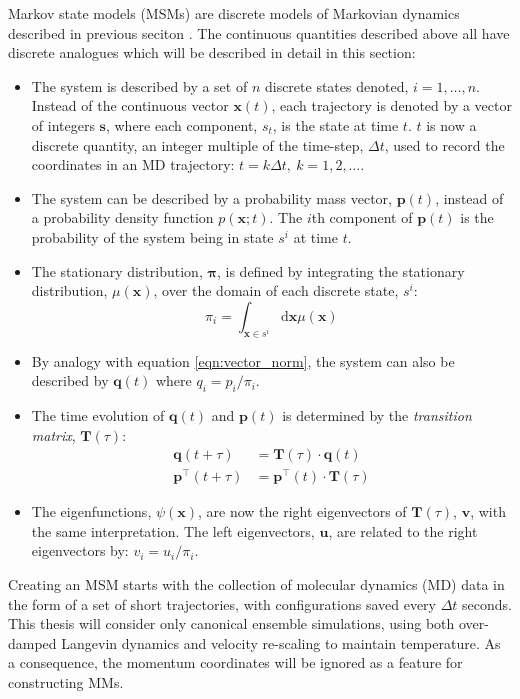 Markov state models (MSMs) are discrete models of Markovian dynamics described in previous seciton \cite{prinzMarkovModelsMolecular2011}. The continuous quantities described above all have discrete analogues which will be described in detail in this section:
\begin{itemize}
    \item The system is described by a set of $n$ discrete states denoted, $i=1, \ldots, n$. Instead of the continuous vector $\mathbf{x}(t)$, each trajectory is denoted by a vector of integers $\mathbf{s}$, where each component, $s_t$, is the state at time $t$. $t$ is now a discrete quantity, an integer multiple of the time-step, $\Delta t$, used to record the coordinates in an MD trajectory: $t=k\Delta t,\ k=1, 2, \ldots$. 
    \item The system can be described by a probability mass vector, $\mathbf{p}(t)$,  instead of a probability density function $p(\mathbf{x};t)$. The $i$th component of $\mathbf{p}(t)$ is the probability of the system being in  state $s^{i}$ at time $t$.
    \item The stationary distribution, $\bm{\pi}$, is defined by integrating the stationary distribution, $\mu(\mathbf{x})$, over the domain of each discrete state, $s^{i}$:
        \begin{equation*}
            \pi_{i}=\int_{\mathbf{x} \in s^{i}} \mathrm{d}\mathbf{x}\mu(\mathbf{x})
        \end{equation*}
    \item By analogy with equation \ref{eqn:vector_norm}, the system can also be described by $\mathbf{q}(t)$ where $q_{i} = p_{i}/\pi_{i}$.
    \item The time evolution of $\mathbf{q}(t)$ and $\mathbf{p}(t)$ is determined by the \emph{transition matrix}, $\mathbf{T}(\tau)$:
        \begin{align*}
            \mathbf{q}(t+\tau) &= \mathbf{T}(\tau) \cdot \mathbf{q}(t) \\
            \mathbf{p}^{\top}(t+\tau) & = \mathbf{p}^{\top}(t)\cdot \mathbf{T}(\tau)
        \end{align*}
    \item The eigenfunctions, $\psi(\mathbf{x})$, are now the right eigenvectors of $\mathbf{T}(\tau)$, $\mathbf{v}$, with the same interpretation. The left eigenvectors, $\mathbf{u}$, are related to the right eigenvectors by: $v_{i} = u_{i}/\pi_{i}$.  
 \end{itemize}

Creating an MSM starts with the collection of molecular dynamics (MD) data in the form of a set of short trajectories, with configurations saved every $\Delta t$ seconds. This thesis will consider only canonical ensemble simulations, using both over-damped Langevin dynamics \cite{ermakComputerSimulationCharged1974,ermakEquilibriumElectrostaticEffects1974} and velocity re-scaling \cite{bussiCanonicalSamplingVelocity2007} to maintain temperature. As a consequence, the momentum coordinates will be ignored as a feature for constructing MMs. 


